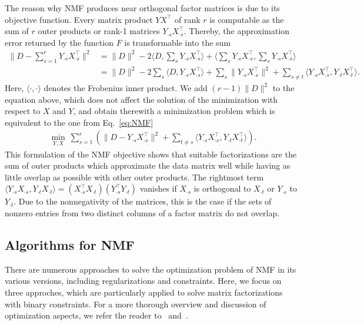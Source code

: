 The reason why NMF produces near orthogonal factor matrices is due to its objective function. Every matrix product $YX^\top$ of rank $r$ is computable as the sum of $r$ outer products or rank-1 matrices $Y_{\cdot s}X_{\cdot s}^\top$. Thereby, the approximation error returned by the function $F$ is transformable into the sum
\begin{align*}
\|D-\sum_{s=1}^rY_{\cdot s}X_{\cdot s}^\top\|^2 &= \|D\|^2 -2\langle D,\sum_sY_{\cdot s}X_{\cdot s}^\top\rangle +\langle \sum_sY_{\cdot s}X_{\cdot s}^\top,\sum_sY_{\cdot s}X_{\cdot s}^\top\rangle\\
&= \|D\|^2 -2\sum_s\langle D,Y_{\cdot s}X_{\cdot s}^\top\rangle +\sum_s \|Y_{\cdot s}X_{\cdot s}^\top\|^2 + \sum_{s\neq t}\langle Y_{\cdot s}X_{\cdot s}^\top,Y_{\cdot t}X_{\cdot t}^\top\rangle.
\end{align*}
Here, $\langle\cdot,\cdot\rangle$ denotes the Frobenius inner product. We add $(r-1)\|D\|^2$ to the equation above, which does not affect the solution of the minimization with respect to $X$ and $Y$, and obtain therewith a minimization problem which is equivalent to the one from Eq.~\eqref{eq:NMF} 
\begin{align}
\min_{Y,X}\ \sum_{s=1}^r \left( \|D-Y_{\cdot s}X_{\cdot s}^\top\|^2 + \sum_{t\neq s}\langle Y_{\cdot s}X_{\cdot s}^\top,Y_{\cdot t}X_{\cdot t}^\top\rangle\right).\label{eq:NMFOrth}
\end{align}
This formulation of the NMF objective shows that suitable factorizations are the sum of outer products which approximate the data matrix well while having as little overlap as possible with other outer products. The rightmost term $\langle Y_{\cdot s}X_{\cdot s},Y_{\cdot t}X_{\cdot t}\rangle = (X_{\cdot s}^\top X_{\cdot t})(Y_{\cdot s}^\top Y_{\cdot t})$ vanishes if $X_{\cdot s}$ is orthogonal to $X_{\cdot t}$ or $Y_{\cdot s}$ to $Y_{\cdot t}$. Due to the nonnegativity of the matrices, this is the case if the sets of nonzero entries from two distinct columns of a factor matrix do not overlap. 
\subsection{Algorithms for NMF}
There are numerous approaches to solve the optimization problem of NMF in its various versions, including regularizations and constraints. Here, we focus on three approches, which are particularly applied to solve matrix factorizations with binary constraints. For a more thorough overview and discussion of optimization aspects, we refer the reader to~\cite{cichocki2009nonnegative} and~\cite{kim2014algorithms}.
%
